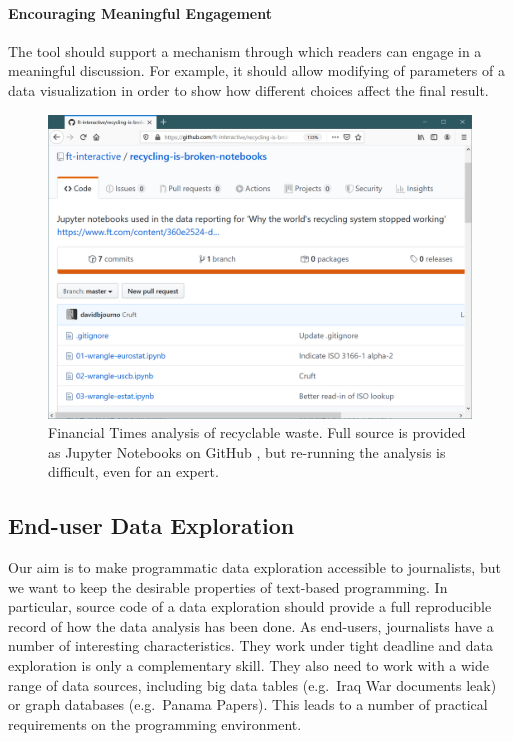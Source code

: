 \documentclass{sigchi}
\begin{document}
\paragraph{Encouraging Meaningful Engagement}
The tool should support a mechanism through which readers can engage in a meaningful discussion.
For example, it should allow modifying of parameters of a data visualization in order to show
how different choices affect the final result.

\begin{figure}
\includegraphics[width=1\columnwidth]{figures/ft}
\caption{Financial Times analysis of recyclable waste. Full source is provided as Jupyter Notebooks
on GitHub \cite{ftnotebooks}, but re-running the analysis is difficult, even for an expert.}
\label{fig:ft}
\end{figure}

\subsection{End-user Data Exploration}
Our aim is to make programmatic data exploration accessible to journalists, but we want to keep
the desirable properties of text-based programming. In particular, source code of a data
exploration should provide a full reproducible record of how the data analysis has been done.
As end-users, journalists have a number of interesting characteristics. They work under tight
deadline and data exploration is only a complementary skill. They also need to work with a wide
range of data sources, including big data tables (e.g.~Iraq War documents leak) or graph
databases (e.g.~Panama Papers). This leads to a number of practical requirements on the programming
environment.
\end{document}
